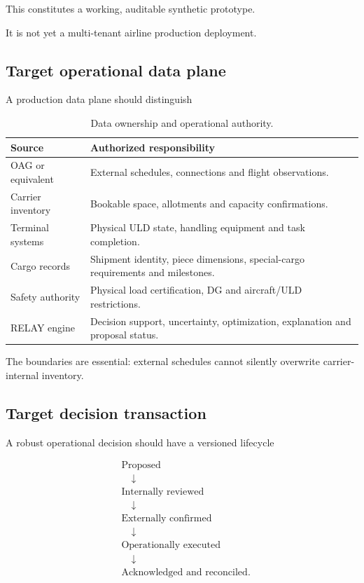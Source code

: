 \documentclass[10pt,a4paper]{article}
\theoremstyle{plain}
\theoremstyle{definition}
\theoremstyle{remark}
\begin{document}
This constitutes a working,
auditable synthetic prototype.

It is not yet a
multi-tenant airline production deployment.

\subsection{Target operational data plane}

A production data plane should distinguish

\begin{table}[!htbp]
\centering
\caption{Data ownership and operational authority.}
\small
\begin{tabularx}{\linewidth}{@{}p{34mm}L@{}}
\toprule
Source & Authorized responsibility \\
\midrule
OAG or equivalent &
External schedules,
connections and flight observations. \\
Carrier inventory &
Bookable space,
allotments and capacity confirmations. \\
Terminal systems &
Physical ULD state,
handling equipment and task completion. \\
Cargo records &
Shipment identity, piece dimensions,
special-cargo requirements and milestones. \\
Safety authority &
Physical load certification,
DG and aircraft/ULD restrictions. \\
RELAY engine &
Decision support, uncertainty,
optimization, explanation and proposal status. \\
\bottomrule
\end{tabularx}
\end{table}

The boundaries are essential:
external schedules cannot silently
overwrite carrier-internal inventory.

\subsection{Target decision transaction}

A robust operational decision should
have a versioned lifecycle

\[
\begin{aligned}
&\text{Proposed}\\
&\quad\downarrow\\
&\text{Internally reviewed}\\
&\quad\downarrow\\
&\text{Externally confirmed}\\
&\quad\downarrow\\
&\text{Operationally executed}\\
&\quad\downarrow\\
&\text{Acknowledged and reconciled}.
\end{aligned}
\]
\end{document}
